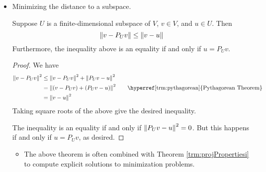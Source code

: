 \documentclass[../main.tex]{subfiles}
\begin{document}
\begin{itemize}
\begin{theorem}
\begin{enumerate}[label={\textup{(}\alph*\textup{)}},ref={\thetheorem\alph*}]
\begin{proof}
\begin{align*}
                    &\leq \norm{u}^2+\norm{w}^2\\
                    &= \norm{v}^2\tag*{\hyperref[trm:pythagorean]{Pythagorean Theorem}}
                \end{align*}
                Taking square roots gives the desired inequality.
            \end{proof}
            \item \label{trm:projPropertiesi}For every orthonormal basis $e_1,\dots,e_m$ of $U$,
            \begin{equation*}
                P_Uv = \inp{v}{e_1}e_1+\cdots+\inp{v}{e_m}e_m
            \end{equation*}
            \begin{proof}
                If $v=u+w$ with $u\in U$ and $w\in U^\perp$, then
                \begin{align*}
                    P_Uv &= u\\
                    &= \inp{v}{e_1}e_1+\cdots+\inp{v}{e_m}e_m\tag*{Theorem \ref{trm:linCombOrthonormal}}
                \end{align*}
                as desired.
            \end{proof}
        \end{enumerate}
    \end{theorem}
    \item Minimizing the distance to a subspace.
    \begin{theorem}
        Suppose $U$ is a finite-dimensional subspace of $V$, $v\in V$, and $u\in U$. Then
        \begin{equation*}
            \norm{v-P_Uv} \leq \norm{v-u}
        \end{equation*}
        Furthermore, the inequality above is an equality if and only if $u=P_Uv$.
        \begin{proof}
            We have
            \begin{align*}
                \norm{v-P_Uv}^2 &\leq \norm{v-P_Uv}^2+\norm{P_Uv-u}^2\\
                &= \norm{(v-P_Uv)+(P_Uv-u)}^2\tag*{\hyperref[trm:pythagorean]{Pythagorean Theorem}}\\
                &= \norm{v-u}^2
            \end{align*}
            Taking square roots of the above give the desired inequality.\par
            The inequality is an equality if and only if $\norm{P_Uv-u}^2=0$. But this happens if and only if $u=P_Uv$, as desired.
        \end{proof}
    \end{theorem}
    \begin{itemize}
        \item The above theorem is often combined with Theorem \ref{trm:projPropertiesi} to compute explicit solutions to minimization problems.
    \end{itemize}
\end{itemize}
\end{document}
